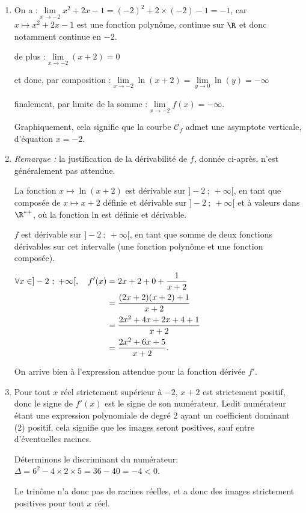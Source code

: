 \begin{enumerate}
\item On a :\quad $\lim\limits_{x \to -2} x^2 + 2x - 1 = (-2)^2 + 2\times (-2) - 1 = -1$, \quad car $x\longmapsto x^2 + 2x - 1$ est une fonction polynôme, continue sur $\R$ et donc notamment continue en $-2$.

de plus :\quad $\lim\limits_{x \to -2} (x + 2) = 0$

et donc, par composition :\quad $\lim\limits_{x \to -2}\ln(x+2) = \lim\limits_{y \to 0} \ln(y) = -\infty$

finalement, par limite de la somme :\quad $\lim\limits_{x \to -2}f(x) = -\infty$.

Graphiquement, cela signifie que la courbe $\mathcal{C}_f$ admet une asymptote verticale, d'équation $x = -2$.

\item \emph{Remarque :} la justification de la dérivabilité de $f$, donnée ci-après, n'est généralement pas attendue.

\smallskip

La fonction $x \longmapsto \ln(x+2)$ est dérivable sur $]-2~;~+\infty[$, en tant que composée de $x \longmapsto x+2$ définie et dérivable sur $]-2~;~+\infty[$ et à valeurs dans $\R^{*+}$, où la fonction ln est définie et dérivable.

$f$ est dérivable sur $]-2~;~+\infty[$, en tant que somme de deux fonctions dérivables sur cet intervalle (une fonction polynôme et une fonction composée).

$\aligned \forall x \in ]-2~;~+\infty[,\quad f'(x)&=2x + 2 + 0 + \dfrac{1}{x+2}\\
&=\dfrac{(2x + 2)(x+2) + 1}{x+2}\\
&=\dfrac{2x^2 + 4x + 2x + 4 + 1}{x+2}\\
&=\dfrac{2 x^{2} + 6x + 5}{x + 2}.\endaligned$

On arrive bien à l'expression attendue pour la fonction dérivée $f'$.
\item Pour tout $x$ réel strictement supérieur à $-2$, $x + 2$ est strictement positif, donc le signe de $f'(x)$ est le signe de son numérateur. Ledit numérateur étant une expression polynomiale de degré 2 ayant un coefficient dominant (2) positif, cela signifie que les images seront positives, sauf entre d'éventuelles racines.

Déterminons le discriminant du numérateur: \quad $\Delta = 6^2 - 4\times 2 \times 5 = 36 - 40 = -4 <0$.

Le trinôme n'a donc pas de racines réelles, et a donc des images strictement positives pour tout $x$ réel.


\end{enumerate}
